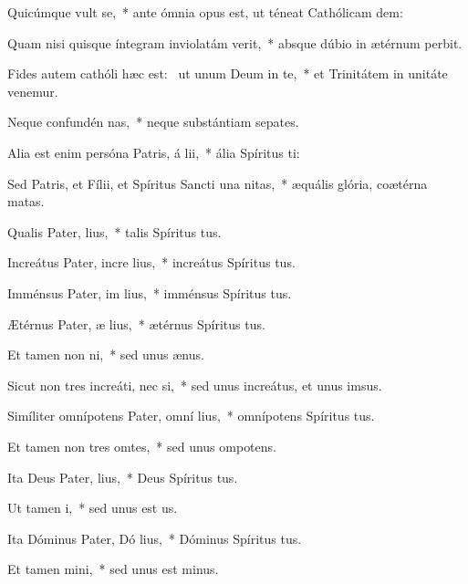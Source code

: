 \item Quicúmque vult  se,~* ante ómnia opus est, ut téneat Cathólicam dem:
\item Quam nisi quisque íntegram inviolatám verit,~* absque dúbio in ætérnum perbit.
\item Fides autem cathóli hæc est:~\pscross{} ut unum Deum in te,~* et Trinitátem in unitáte venemur.
\item Neque confundén nas,~* neque substántiam sepates.
\item Alia est enim persóna Patris, á lii,~* ália Spíritus ti:
\item Sed Patris, et Fílii, et Spíritus Sancti una  nitas,~* æquális glória, coætérna matas.
\item Qualis Pater,  lius,~* talis Spíritus tus.
\item Increátus Pater, incre lius,~* increátus Spíritus tus.
\item Imménsus Pater, im lius,~* imménsus Spíritus tus.
\item Ætérnus Pater, æ lius,~* ætérnus Spíritus tus.
\item Et tamen non  ni,~* sed unus ænus.
\item Sicut non tres increáti, nec  si,~* sed unus increátus, et unus imsus.
\item Simíliter omnípotens Pater, omní lius,~* omnípotens Spíritus tus.
\item Et tamen non tres omtes,~* sed unus ompotens.
\item Ita Deus Pater,  lius,~* Deus Spíritus tus.
\item Ut tamen   i,~* sed unus est us.
\item Ita Dóminus Pater, Dó lius,~* Dóminus Spíritus tus.
\item Et tamen   mini,~* sed unus est minus.
